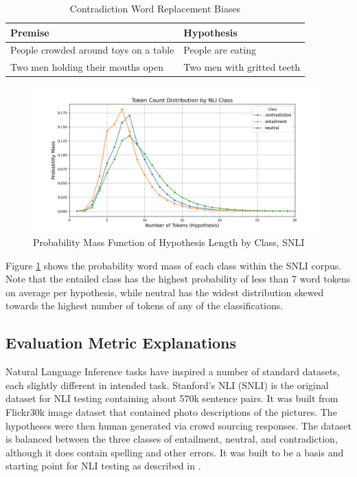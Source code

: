 \documentclass[11pt]{article}
\begin{document}
\begin{table}[!ht]
    \centering
    \begin{tabularx}{0.45\textwidth} { 
  | >{\raggedright\arraybackslash}X 
  | >{\raggedright\arraybackslash}X | }
    \hline
    Premise & Hypothesis \\
    \hline\hline
        People crowded around toys on a table & People are eating \\
        \hline
       Two men holding their mouths open & Two men with gritted teeth \\
        \hline
    \end{tabularx}
    \caption{Contradiction Word Replacement Biases}
    \label{tab:CWRB}
\end{table}
\begin{figure}[!ht]
    \centering
    \includegraphics[width=1.0\linewidth]{Figure_tokenvsprobmass.png}
    \caption{Probability Mass Function of Hypothesis Length by Class, SNLI}
    \label{fig:ProbMassLength}
\end{figure}
Figure \ref{fig:ProbMassLength} shows the probability word mass of each class within the SNLI corpus. Note that the entailed class has the highest probability of less than 7 word tokens on average per hypothesis, while neutral has the widest distribution skewed towards the highest number of tokens of any of the classifications.
\subsection{Evaluation Metric Explanations}
Natural Language Inference tasks have inspired a number of standard datasets, each slightly different in intended task.  Stanford's NLI (SNLI) is the original dataset for NLI testing containing about 570k sentence pairs. It was built from Flickr30k image dataset that contained photo descriptions of the pictures.  The hypotheses were then human generated via crowd sourcing responses. The dataset is balanced between the three classes of entailment, neutral, and contradiction, although it does contain spelling  and other errors.  It was built to be a basis and starting point for NLI testing as described in \citealp{dataAug}.
\end{document}
